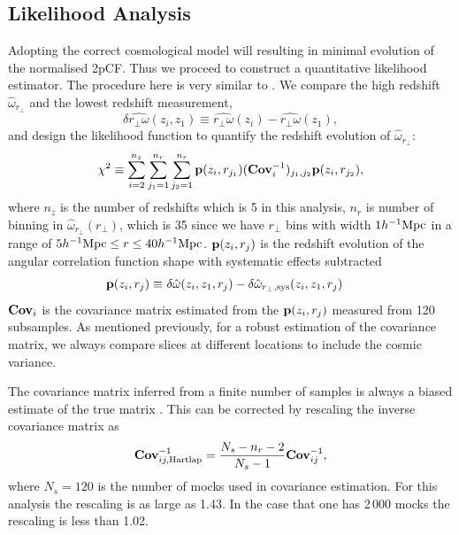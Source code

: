 \documentclass[iop]{emulateapj}
\begin{document}
\subsection{Likelihood Analysis}


Adopting the correct cosmological model will resulting in minimal evolution of the normalised 2pCF.
Thus we proceed to construct a quantitative likelihood estimator.
The procedure here is very similar to \cite{Li2014,Li2015,Li2016}.
We compare the high redshift $\hat\omega_{r_\perp}$ and the lowest redshift measurement,
\begin{equation}
 \delta \hat{r_\perp\omega}(z_i,z_1) \equiv \hat{r_\perp\omega}(z_i) - \hat{r_\perp\omega}(z_1),
\end{equation}
and design the likelihood function to quantify
the redshift evolution of $\hat\omega_{r_\perp}$:
\begin{equation}\label{eq:chisq1}
\chi^2\equiv \sum_{i=2}^{n_{z}} \sum_{j_1=1}^{n_{r}} \sum_{j_2=1}^{n_{r}} {\bf p}(z_i,r_{j_1}) ({\bf Cov}_{i}^{-1})_{j_1,j_2}  {\bf p}(z_i,r_{j_2}),
\end{equation}
where $n_z$ is the number of redshifts which is 5 in this analysis, 
$n_r$ is number of binning in $\hat{\omega}_{r_\perp}(r_\perp)$,
which is 35 since we have $r_\perp$ bins 
with width $1h^{-1}\rm Mpc$ in a range of $5h^{-1}{\rm Mpc}\leq r\leq 40h^{-1}{\rm Mpc}$.
${\bf p}(z_i,r_{j})$ is the redshift evolution of the angular correlation function shape with systematic effects subtracted
\begin{eqnarray}\label{eq:bfp}
 {\bf p}(z_i,r_{j}) \equiv&\ \delta \hat{\omega}(z_i,z_1,r_j) - \delta \hat{\omega}_{r_\perp,\rm sys}(z_i,z_1,r_j)
\end{eqnarray}
${\bf Cov}_i$ is the covariance matrix estimated from the ${\bf p}(z_i,r_{j})$ measured from 120 subsamples.
As mentioned previously, for a robust estimation of the covariance matrix, 
we always compare slices at different locations to 
include the cosmic variance.

The covariance matrix inferred from a finite number of samples
is always a biased estimate of the true matrix \citep{Hartlap}.
This can be corrected by rescaling the inverse covariance matrix as 
\begin{equation}
 {\bf Cov}^{-1}_{ij,\rm Hartlap} = \frac{N_s - n_{r}-2}{N_s-1} {\bf Cov}^{-1}_{ij},
\end{equation}
where $N_s=120$ is the number of mocks used in covariance estimation.
For this analysis the rescaling is as large as 1.43.
In the case that one has 2\,000 mocks the rescaling is less than 1.02.
\end{document}
